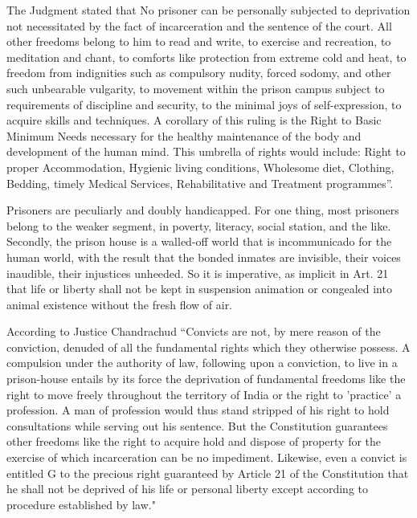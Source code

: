 \begin{multicols}{2}
\noi
The Judgment stated that No prisoner can be personally subjected to deprivation not necessitated by the fact of incarceration and the sentence of the court. All other freedoms belong to him to read and write, to exercise and recreation, to meditation and chant, to comforts like protection from extreme cold and heat, to freedom from indignities such as compulsory nudity, forced sodomy, and other such unbearable vulgarity, to movement within the prison campus subject to requirements of discipline and security, to the minimal joys of self-expression, to acquire skills and techniques. A corollary of this ruling is the Right to Basic Minimum Needs necessary for the healthy maintenance of the body and development of the human mind. This umbrella of rights would include: Right to proper Accommodation, Hygienic living conditions, Wholesome diet, Clothing, Bedding, timely Medical Services, Rehabilitative and Treatment programmes”.

\noi
Prisoners are peculiarly and doubly handicapped. For one thing, most prisoners belong to the weaker segment, in poverty, literacy, social station, and the like. Secondly, the prison house is a walled-off world that is incommunicado for the human world, with the result that the bonded inmates are invisible, their voices inaudible, their injustices unheeded. So it is imperative, as implicit in Art. 21 that life or liberty shall not be kept in suspension animation or congealed into animal existence without the fresh flow of air.

\noi
According to Justice Chandrachud “Convicts are not, by mere reason of the conviction, denuded of all the fundamental rights which they otherwise possess. A compulsion under the authority of law, following upon a conviction, to live in a prison-house entails by its force the deprivation of fundamental freedoms like the right to move freely throughout the territory of India or the right to 'practice' a profession. A man of profession would thus stand stripped of his right to hold consultations while serving out his sentence. But the Constitution guarantees other freedoms like the right to acquire hold and dispose of property for the exercise of which incarceration can be no impediment. Likewise, even a convict is entitled G to the precious right guaranteed by Article 21 of the Constitution that he shall not be deprived of his life or personal liberty except according to procedure established by law."


\end{multicols}
